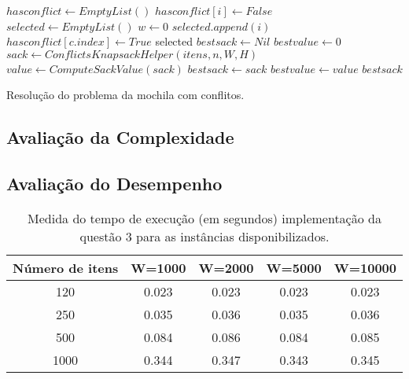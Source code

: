\documentclass[a4paper]{article}
\begin{document}
\begin{algorithm}[H]
\begin{algorithmic}[1]
  \State {}
    \EndFor
    \State $hasconflict \gets EmptyList()$
      \State $hasconflict[i] \gets False$
    \EndFor
    \State $selected \gets EmptyList()$
    \State $w \gets 0$
        \State $selected.append(i)$
          \State $hasconflict[c.index] \gets True$
        \EndFor
      \EndIf
    \EndFor
    \State \Return selected \label{alg:q2:select:end}
  \EndFunction
  \State {}
    \State $bestsack \gets Nil$
    \State $bestvalue \gets 0$
      \State $sack \gets ConflictsKnapsackHelper(itens, n, W, H)$
      \State $value \gets ComputeSackValue(sack)$
        \State $bestsack \gets sack$
        \State $bestvalue \gets value$
      \EndIf
    \EndFor
    \State \Return $bestsack$
  \EndFunction
\end{algorithmic}
\caption{Resolução do problema da mochila com conflitos.}
\label{alg:q3}
\end{algorithm}

\subsection{Avaliação da Complexidade}

\subsection{Avaliação do Desempenho}

\begin{table}[H]
\centering
\begin{tabular}{c|c|c|c|c}
Número de itens & W=1000 & W=2000 & W=5000 & W=10000 \\
\hline
120 & 0.023	& 0.023	& 0.023	& 0.023	\\
250 & 0.035	& 0.036	& 0.035	& 0.036	\\
500 & 0.084	& 0.086	& 0.084	& 0.085	\\
1000 & 0.344	& 0.347	& 0.343	& 0.345	\\
\end{tabular}
\caption{Medida do tempo de execução (em segundos) implementação da questão 3 para as instâncias disponibilizados.}
\label{tab:q3:bench}
\end{table}
\end{document}
